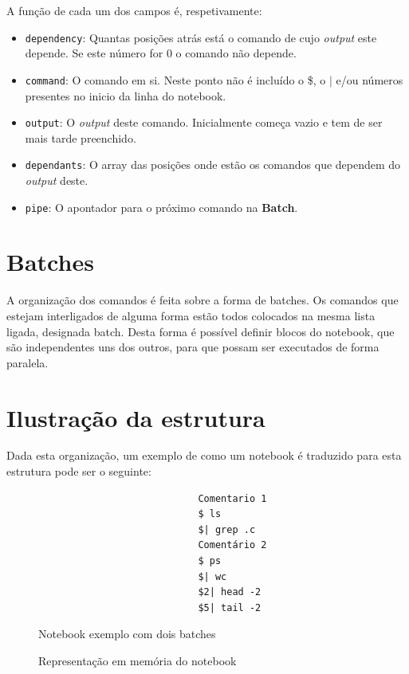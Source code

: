 \documentclass[12pt,a4paper]{report}
\begin{document}
    A função de cada um dos campos é, respetivamente:
    \begin{itemize}
        \item \texttt{dependency}: Quantas posições atrás está o comando
            de cujo \textit{output} este depende. Se este número for 0 o comando
            não depende.

        \item \texttt{command}: O comando em si. Neste ponto não é
            incluído o \$, o $|$ e/ou números presentes no inicio da linha
            do notebook.

        \item \texttt{output}: O \textit{output} deste comando.
            Inicialmente começa vazio e tem de ser mais tarde preenchido.

        \item \texttt{dependants}: O array das posições onde estão os
            comandos que dependem do \textit{output} deste.

        \item \texttt{pipe}: O apontador para o próximo comando na
            \textbf{Batch}.
    \end{itemize}

    \section{Batches}
        A organização dos comandos é feita sobre a forma de batches. Os comandos
        que estejam interligados de alguma forma estão todos colocados na mesma
        lista ligada, designada batch. Desta forma é possível definir blocos do
        notebook, que são independentes uns dos outros, para que possam ser
        executados de forma paralela.

    \section{Ilustração da estrutura}
        Dada esta organização, um exemplo de como um notebook é traduzido para
        esta estrutura pode ser o seguinte:

        \begin{figure}[H]
            \begin{verbatim}
                            Comentario 1
                            $ ls
                            $| grep .c
                            Comentário 2
                            $ ps
                            $| wc
                            $2| head -2
                            $5| tail -2
            \end{verbatim}
            \caption{Notebook exemplo com dois batches}
        \end{figure}
        \begin{figure}[H]
            \centering
            
            \caption{Representação em memória do notebook}
        \end{figure}
\end{document}
